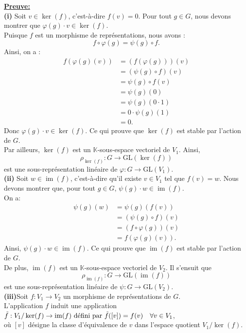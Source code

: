 \documentclass[a4paper, 14pt]{report}
\begin{document}
\begin{onehalfspace}
{\textbf{\underline{Preuve:}}\\
\textbf{(i)} Soit \( v \in \ker(f) \), c’est-à-dire \( f(v) = 0 \). Pour tout \( g \in G \), nous devons montrer que \( \varphi(g) \cdot v \in \ker(f) \).\\
Puisque \( f \) est un morphisme de représentations, nous avons :  
\[
f \circ \varphi(g) = \psi(g) \circ f.
\]
Ainsi, on a :  
\[
\begin{aligned}
	f(\varphi(g)(v)) &= (f(\varphi(g)))(v) \\
	&= (\psi(g) \circ f)(v) \\
	&= \psi(g) \circ f(v) \\
	&= \psi(g)(0) \\
	&= \psi(g)(0 \cdot 1) \\
	&= 0 \cdot \psi(g)(1) \\
	&= 0.
\end{aligned}
\]
Donc \( \varphi(g) \cdot v \in \ker(f) \). Ce qui prouve que \( \ker(f) \) est stable par l’action de \( G \).\\
Par ailleurs, \( \ker(f) \) est un \( \mathbb{K} \)-sous-espace vectoriel de \( V_1 \). Ainsi, 
\[ \rho_{\ker(f)} : G \to \mathrm{GL}(\ker(f))\]  
est une sous-représentation linéaire de \( \varphi : G \to \mathrm{GL}(V_1) \).\\
\textbf{(ii)} Soit \( w \in \operatorname{im}(f) \), c’est-à-dire qu’il existe \( v \in V_1 \) tel que \( f(v) = w \). Nous devons montrer que, pour tout \( g \in G \), \( \psi(g) \cdot w \in \operatorname{im}(f) \).  \\
On a:  
\[
\begin{aligned}
	\psi(g)(w) &= \psi(g)(f(v)) \\
	&= (\psi(g) \circ f)(v) \\
	&= (f \circ \varphi(g))(v) \\
	&= f(\varphi(g)(v)).
\end{aligned}
\]
Ainsi, \( \psi(g) \cdot w \in \operatorname{im}(f) \). Ce qui prouve que \( \operatorname{im}(f) \) est stable par l’action de \( G \).\\  
De plus, \( \operatorname{im}(f) \) est un \( \mathbb{K} \)-sous-espace vectoriel de \( V_2 \). Il s’ensuit que
\[\rho_{\operatorname{im}(f)} : G \to \mathrm{GL}(\operatorname{im}(f))\]
est une sous-représentation linéaire de  
\( \psi : G \to \mathrm{GL}(V_2) \).\\	

\textbf{(iii)}Soit \( f : V_1 \to V_2 \) un morphisme de représentations de \( G \).\\
L'application \( f \) induit une application \\
\( \tilde{f}: V_1 / \ker(f) \to \operatorname{im}(f)$ défini par $\tilde{f}([v]) = f(v) \quad \forall v \in V_1 \), \\
où \( [v] \) désigne la classe d'équivalence de \( v \) dans l'espace quotient \( V_1 / \ker(f) \).\\

}
\end{onehalfspace}
\end{document}
